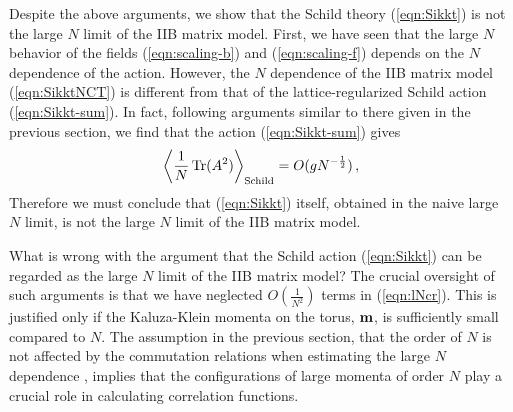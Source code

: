 \documentclass[12pt,a4paper]{article}
\newcommand{\Tr}{\mbox{\rm Tr}}
\begin{document}
Despite the above arguments, we show that the Schild theory
(\ref{eqn:Sikkt}) is not the large $N$ limit of the IIB matrix model.
First, we have seen that the large $N$ behavior of the fields
(\ref{eqn:scaling-b}) and (\ref{eqn:scaling-f}) depends on the $N$
dependence of the action.
However, the $N$ dependence of the IIB matrix model (\ref{eqn:SikktNCT})
is different from that of the lattice-regularized Schild
action (\ref{eqn:Sikkt-sum}). In fact, following arguments similar to
there given in the previous section, we find that the action
(\ref{eqn:Sikkt-sum}) gives
\begin{equation}
  \left\langle\frac{1}{N}\,\Tr (A^2)\right
	\rangle_{\mbox{\scriptsize Schild}} = O(gN^{-\frac{1}{2}})\,,
\end{equation}
Therefore we must conclude that (\ref{eqn:Sikkt}) itself, obtained in
the naive large $N$ limit, is not the large $N$ limit of the IIB
matrix model.

What is wrong with the argument that the Schild action
(\ref{eqn:Sikkt}) can be regarded as the large $N$ limit of the IIB
matrix model? The crucial oversight of such arguments is that we have
neglected $O(\frac{1}{N^2})$ terms in (\ref{eqn:lNcr}).
This is justified only if the Kaluza-Klein momenta on the
torus, ${\bf m}$, is sufficiently small compared to $N$.
The assumption in the previous section, that the order of $N$ is not
affected by the commutation relations when estimating the large
$N$ dependence \cite{KU}, implies that the configurations of large
momenta of order $N$ play a crucial role in calculating correlation
functions.

\end{document}
